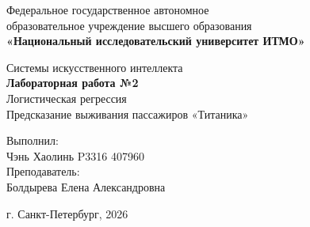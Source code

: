 \begin{titlepage}
    \centering
    Федеральное государственное автономное\\
    образовательное учреждение высшего образования\\
    \textbf{«Национальный исследовательский университет ИТМО»}\\

    \vfill

    Системы искусственного интеллекта\\
    \vspace{0.5\baselineskip}
    \textbf{Лабораторная работа №2}\\
    \vspace{0.5\baselineskip}
    Логистическая регрессия\\
    \vspace{0.5\baselineskip}
    Предсказание выживания пассажиров «Титаника»

    \vfill

    \begin{flushright}
    Выполнил:\\
    Чэнь Хаолинь P3316 407960\\
    Преподаватель:\\
    Болдырева Елена Александровна
    \end{flushright}

    \vspace{4\baselineskip}
    \centering
    г. Санкт-Петербург, 2026
\end{titlepage}
